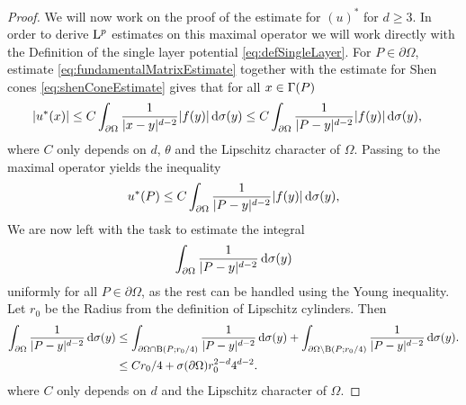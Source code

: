 \begin{proof}

  We will now work on the proof of the estimate for $(u)^*$ for $d \geq 3$.
  In order to derive $\mathrm{L}^p$ estimates on this maximal operator we will work directly with the Definition of the single layer potential \eqref{eq:defSingleLayer}.
  For $P \in \partial\Omega$, estimate \eqref{eq:fundamentalMatrixEstimate} together with the estimate for Shen cones \eqref{eq:shenConeEstimate} gives that for all $x \in \Gamma(P)$
  \begin{align*}
    |u^*(x)| 
    &\leq  C \int_{\partial\Omega} \frac{1}{|x - y|^{d - 2}} |f(y)| \, {\operatorname{d}\!{\sigma}}(y) 
    \leq  C \int_{\partial\Omega} \frac{1}{|P - y|^{d - 2}} |f(y)| \, {\operatorname{d}\!{\sigma}}(y),
  \end{align*}
  where $C$ only depends on $d$, $\theta$ and the Lipschitz character of $\Omega$.
  Passing to the maximal operator yields the inequality
  \begin{align*}
    u^*(P) \leq  C \int_{\partial\Omega} \frac{1}{|P - y|^{d - 2}} |f(y)| \, {\operatorname{d}\!{\sigma}}(y),
  \end{align*}
  We are now left with the task to estimate the integral 
  \begin{align*}
    \int_{\partial\Omega} \frac{1}{|P - y|^{d - 2}} \, {\operatorname{d}\!{\sigma}}(y)
  \end{align*}
  uniformly for all $P \in \partial\Omega$, as the rest can be handled using the Young inequality.
  Let $r_0$ be the Radius from the definition of Lipschitz cylinders.
  Then
  \begin{align*}
    \int_{\partial\Omega} \frac{1}{|P - y|^{d - 2}} \, {\operatorname{d}\!{\sigma}}(y)
    &\leq \int_{\partial\Omega \cap \mathrm{B}(P; r_0/4)} \frac{1}{|P - y|^{d - 2}} \, {\operatorname{d}\!{\sigma}}(y) + \int_{\partial\Omega \setminus \mathrm{B}(P; r_0/4)} \frac{1}{|P - y|^{d - 2}} \, {\operatorname{d}\!{\sigma}}(y). \\
    & \leq C r_0/4 +  \sigma(\partial\Omega) r_0^{2 - d} 4^{d - 2}.
  \end{align*}
  where $C$ only depends on $d$ and the Lipschitz character of $\Omega$.
\end{proof}

